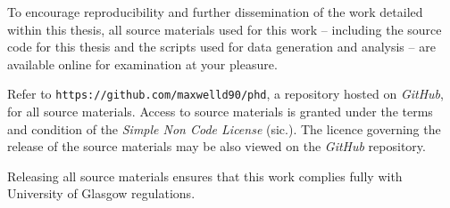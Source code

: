 
\begin{preamble}
To encourage reproducibility and further dissemination of the work detailed within this thesis, all source materials used for this work -- including the source code for this thesis and the scripts used for data generation and analysis -- are available online for examination at your pleasure.

Refer to \texttt{https://github.com/maxwelld90/phd}, a repository hosted on \emph{GitHub}, for all source materials. Access to source materials is granted under the terms and condition of the \emph{Simple Non Code License} (sic.). The licence governing the release of the source materials may be also viewed on the \emph{GitHub} repository.

Releasing all source materials ensures that this work complies fully with University of Glasgow regulations.

\end{preamble}